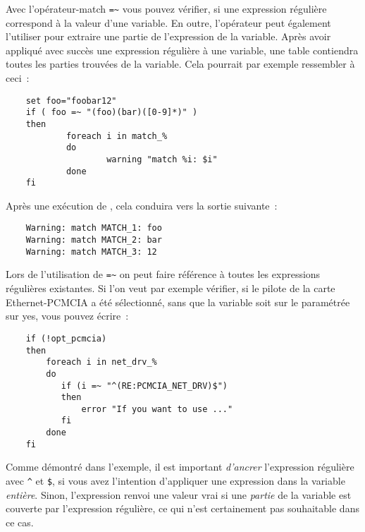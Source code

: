 Avec l'opérateur-match \verb?=~? vous pouvez vérifier, si une expression
régulière correspond à la valeur d'une variable. En outre,
l'opérateur peut également l’utiliser pour extraire une partie de l’expression
de la variable. Après avoir appliqué avec succès une expression régulière à
une variable, une table  contiendra toutes les parties trouvées de
la variable. Cela pourrait par exemple ressembler à ceci~:

\begin{example}
\begin{verbatim}
    set foo="foobar12"
    if ( foo =~ "(foo)(bar)([0-9]*)" )
    then
            foreach i in match_%
            do
                    warning "match %i: $i"
            done
    fi
\end{verbatim}
\end{example}

Après une exécution de , cela conduira vers la sortie suivante~:

\begin{example}
\begin{verbatim}
    Warning: match MATCH_1: foo
    Warning: match MATCH_2: bar
    Warning: match MATCH_3: 12
\end{verbatim}
\end{example}

  Lors de l'utilisation de \verb?=~? on peut faire référence à toutes les expressions
  régulières existantes. Si l'on veut par exemple vérifier, si le pilote de la carte
  Ethernet-PCMCIA a été sélectionné, sans que la variable  soit sur le
  paramétrée sur \og{}yes\fg{}, vous pouvez écrire~:

\begin{example}
\begin{verbatim}
    if (!opt_pcmcia)
    then
        foreach i in net_drv_%
        do
           if (i =~ "^(RE:PCMCIA_NET_DRV)$")
           then
               error "If you want to use ..."
           fi
        done
    fi
\end{verbatim}
\end{example}

Comme démontré dans l'exemple, il est important \emph{d'ancrer} l'expression régulière avec
\texttt{\^} et \texttt{\$}, si vous avez l'intention d'appliquer une expression dans la variable
\emph{entière}. Sinon, l'expression renvoi une valeur \og{}vrai\fg{} si une \emph{partie} de
la variable est couverte par l'expression régulière, ce qui n'est certainement pas souhaitable
dans ce cas.


